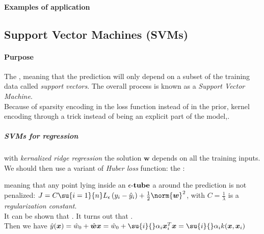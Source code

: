\paragraph{Examples of application}

\subsection{Support Vector Machines (SVMs)}
\paragraph{Purpose}
The , meaning that the prediction will only depend on a
subset of the training data called \emph{support vectors}. The overall 
process is known as a \emph{Support Vector Machine}.\\
Because of sparsity encoding in the loss function instead of in the prior, 
kernel encoding through a trick instead of being an explicit part of the 
model,.
\subparagraph{SVMs for regression}
with \emph{kernalized ridge regression} the solution $\bm{w}$ depends on all 
the training inputs. We should then use a variant of \emph{Huber loss} 
function: the : 
\begin{center}
\end{center}
meaning that any point lying inside an $\epsilon\text{-\textbf{tube}}$ a
around the prediction is not penalized: $J=C\su{i=1}{n}L_{\epsilon}\left(
y_{i} - \hat{y}_{i}\right) + \frac{1}{2}\norm{\bm{w}}^{2}$, with $C=\frac{1}{
\lambda}$ is a \emph{regularization constant}.\\
It can be shown that . It turns out that .\\
Then we have $\hat{y}(\bm{x}) = \hat{w}_{0} + \hat{\bm{w}}\bm{x}  = \hat{w}_{0}
+ \su{i}{}\alpha_{i}\bm{x}_{i}^{T}\bm{x} = \su{i}{}\alpha_{i}k(\bm{x},\bm{x}_{i})$

